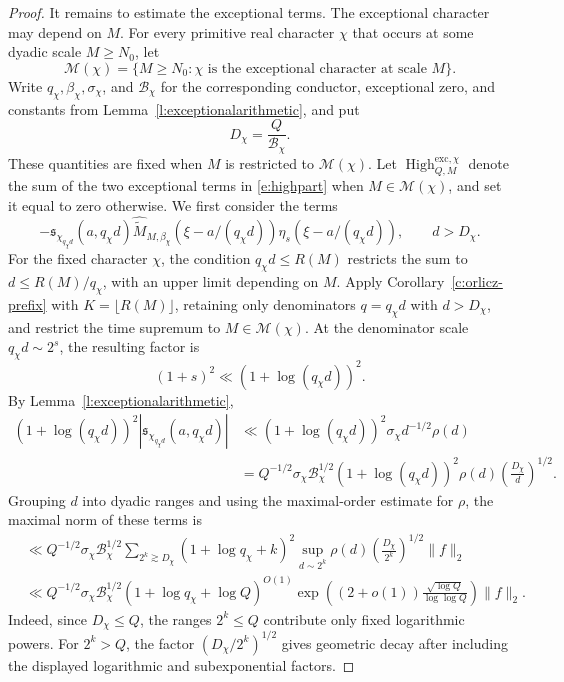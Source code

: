 \documentclass[12pt,reqno]{amsart}
\numberwithin{equation}{section}
\theoremstyle{definition}
\theoremstyle{remark}
\begin{document}
\begin{proof}
It remains to estimate the exceptional terms.  The exceptional
character may depend on \(M\).  For every primitive real character
\(\chi\) that occurs at some dyadic scale \(M\geq N_0\), let
\[
 \mathcal M(\chi)
 =
 \{M\geq N_0:\chi\text{ is the exceptional character at scale }M\}.
\]
Write \(q_\chi,\beta_\chi,\sigma_\chi\), and \(\mathcal B_\chi\) for
the corresponding conductor, exceptional zero, and constants from
Lemma~\ref{l:exceptionalarithmetic}, and put
\[
 D_\chi=\frac{Q}{\mathcal B_\chi}.
\]
These quantities are fixed when \(M\) is restricted to
\(\mathcal M(\chi)\). Let \(\operatorname{High}^{\mathrm{exc},\chi}_{Q,M}\) denote the sum of
the two exceptional terms in \eqref{e:highpart} when
\(M\in\mathcal M(\chi)\), and set it equal to zero otherwise.
  We first consider the terms
\[
 -\mathfrak s_{\chi_{q_\chi d}}(a,q_\chi d)
 \widehat{\widetilde M}_{M,\beta_\chi}
       (\xi-a/(q_\chi d))
 \eta_s(\xi-a/(q_\chi d)),
 \qquad d>D_\chi.
\]
For the fixed character \(\chi\), the condition
\(q_\chi d\leq R(M)\) restricts the sum to
\(d\leq R(M)/q_\chi\), with an upper limit depending on \(M\).
Apply Corollary~\ref{c:orlicz-prefix} with
\(K=\lfloor R(M)\rfloor\), retaining only denominators
\(q=q_\chi d\) with \(d>D_\chi\), and restrict the time supremum
to \(M\in\mathcal M(\chi)\). At the denominator scale
\(q_\chi d\sim2^s\), the resulting factor is
\[
 (1+s)^2\ll(1+\log(q_\chi d))^2.
\]
By Lemma~\ref{l:exceptionalarithmetic},
\begin{align*}
 (1+\log(q_\chi d))^2
 |\mathfrak s_{\chi_{q_\chi d}}(a,q_\chi d)|&\ll
 (1+\log(q_\chi d))^2
 \sigma_\chi d^{-1/2}\rho(d)\\
 &=
 Q^{-1/2}\sigma_\chi\mathcal B_\chi^{1/2}
 (1+\log(q_\chi d))^2\rho(d)
 \left(\frac{D_\chi}{d}\right)^{1/2}.
\end{align*}
Grouping \(d\) into dyadic ranges and using the maximal-order
estimate for \(\rho\), the maximal norm of these terms is
\begin{align*}
 &\ll
 Q^{-1/2}\sigma_\chi\mathcal B_\chi^{1/2}
 \sum_{2^k\gtrsim D_\chi}
 (1+\log q_\chi+k)^2
 \sup_{d\sim2^k}\rho(d)
 \left(\frac{D_\chi}{2^k}\right)^{1/2}\|f\|_2\\
 &\ll
 Q^{-1/2}\sigma_\chi\mathcal B_\chi^{1/2}
 (1+\log q_\chi+\log Q)^{O(1)}
 \exp\left(
 (2+o(1))\frac{\sqrt{\log Q}}{\log\log Q}
 \right)\|f\|_2.
\end{align*}
Indeed, since \(D_\chi\leq Q\), the ranges \(2^k\leq Q\)
contribute only fixed logarithmic powers. For \(2^k>Q\),
the factor \((D_\chi/2^k)^{1/2}\) gives geometric decay
after including the displayed logarithmic and subexponential
factors.


\end{proof}
\end{document}
